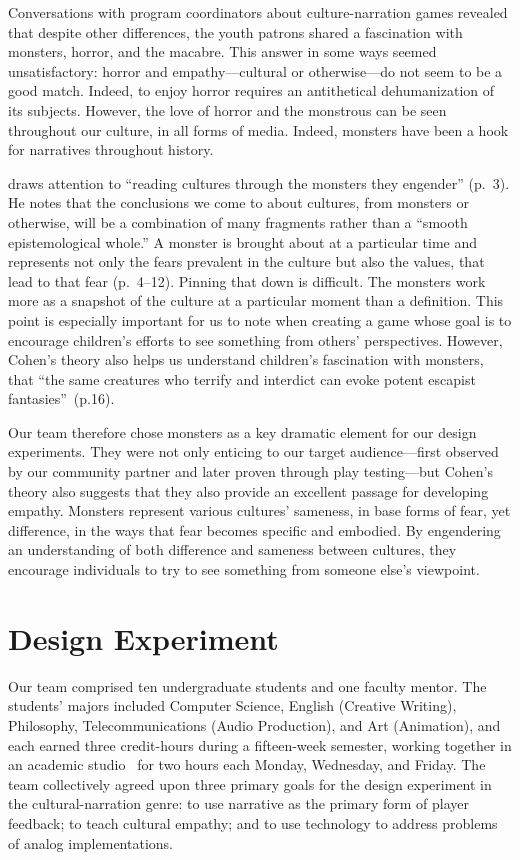 \documentclass[a4paper]{article}
\begin{document}
Conversations with program coordinators about culture-narration games
revealed that despite other differences, the youth patrons shared a
fascination with monsters, horror, and the macabre.  This answer in
some ways seemed unsatisfactory: horror and empathy---cultural or
otherwise---do not seem to be a good match. Indeed,
to enjoy horror requires an antithetical dehumanization of its subjects.
However, the love of horror and the monstrous can be
seen throughout our culture, in all forms of media. Indeed, monsters have
been a hook for narratives throughout history. 

\citet{Cohen1996} draws attention to ``reading cultures through the
monsters they engender'' (p.~3).  He notes that the conclusions we
come to about cultures, from monsters or otherwise, will be a
combination of many fragments rather than a ``smooth epistemological
whole.'' A monster is brought about at a particular time and
represents not only the fears prevalent in the culture but also the
values, that lead to that fear (p.~4--12). Pinning that down is
difficult. The monsters work more as a snapshot of the culture at
a particular moment than a definition. This point is especially
important for us to note when creating a game whose goal is to
encourage children's efforts to see something from others'
perspectives.
However, Cohen's theory also helps us understand children's fascination
with monsters, that ``the same creatures who terrify and interdict can evoke potent escapist fantasies''~(p.16).

Our team therefore chose monsters as a key dramatic element for our 
design experiments. They were not only enticing to our target
audience---first observed by our community partner and later proven
through play testing---but Cohen's theory also 
suggests that they also provide an excellent passage for
developing empathy. Monsters represent
various cultures' sameness, in base forms of fear, yet difference, in
the ways that fear becomes specific and embodied. By engendering an
understanding of both difference and sameness between cultures, they
encourage individuals to try to see something from someone else's
viewpoint.


\section{Design Experiment}

Our team comprised ten undergraduate students and one faculty mentor.
The students' majors included Computer Science, English
(Creative Writing), Philosophy, Telecommunications (Audio Production),
and Art (Animation), and 
each earned three credit-hours during a fifteen-week
semester,
working together in an academic studio~\citep{Gestwicki2016}
for two hours each Monday, Wednesday, and Friday.
The team collectively agreed upon three primary goals for the design
experiment in the cultural-narration genre:
to use narrative as the primary form of player feedback;
to teach cultural empathy;
and to use technology to address problems of analog implementations.
\end{document}
